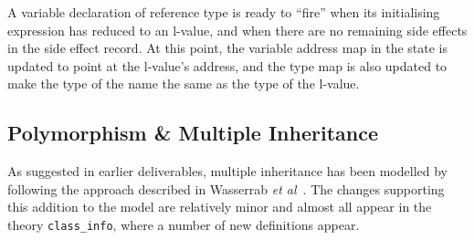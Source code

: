 \documentclass[11pt]{article}
\begin{document}
A variable declaration of reference type is ready to ``fire'' when its
initialising expression has reduced to an l-value, and when there are
no remaining side effects in the side effect record.  At this point,
the variable address map in the state is updated to point at the
l-value's address, and the type map is also updated to make the type
of the name the same as the type of the l-value.





\subsection{Polymorphism \& Multiple Inheritance}
\label{sec:multiple-inheritance}

As suggested in earlier deliverables, multiple inheritance has been
modelled by following the approach described in Wasserrab \emph{et
  al}~\cite{wasserrab-nst-OOPSLA06}.  The changes supporting this
addition to the model are relatively minor and almost all appear in
the theory \texttt{class_info}, where a number of new definitions
appear.

\newcommand{\Cs}{\mathit{Cs}} \newcommand{\fld}{\mathit{fld}}
\end{document}
